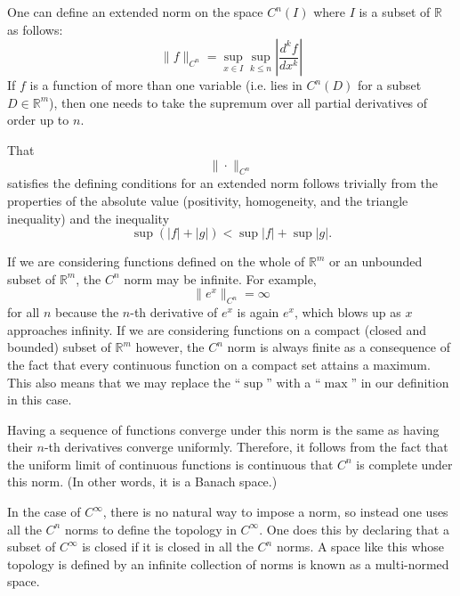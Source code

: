 \documentclass[12pt]{article}
\begin{document}
One can define an extended norm on the space $C^n (I)$ where $I$ is a subset of $\mathbb{R}$ as follows:
 $$\| f \|_{C^n} = \sup_{x \in I} \sup_{k \le n} \left| \frac{d^k f}{dx^k} \right|$$
If $f$ is a function of more than one variable (i.e. lies in $C^n (D)$ for a subset $D \in \mathbb{R}^m$), then one needs to take the supremum over all partial derivatives of order up to $n$.  

That $$\| \cdot \|_{C^n}$$ satisfies the defining conditions for an extended norm follows trivially from the properties of the absolute value (positivity, homogeneity, and the triangle inequality) and the inequality
 $$\sup (|f| + |g|) < \sup |f| + \sup |g|.$$

If we are considering functions defined on the whole of $\mathbb{R}^m$ or an unbounded subset of $\mathbb{R}^m$, the $C^n$ norm may be infinite.  For example,
 $$\| e^x \|_{C^n} = \infty$$
for all $n$ because the $n$-th derivative of $e^x$ is again $e^x$, which blows up as $x$ approaches infinity.  If we are considering functions on a compact (closed and bounded) subset of $\mathbb{R}^m$ however, the $C^n$ norm is always finite as a consequence of the fact that every continuous function on a compact set attains a maximum.  This also means that we may replace the ``$\sup$'' with a ``$\max$'' in our definition in this case.

Having a sequence of functions converge under this norm is the same as having their $n$-th derivatives converge uniformly.  Therefore, it follows from the fact that the uniform limit of continuous functions is continuous that $C^n$ is complete under this norm. (In other words, it is a Banach space.)

In the case of $C^{\infty}$, there is no natural way to impose a norm, so instead one uses all the $C^n$ norms to define the topology in $C^\infty$.  One does this by declaring that a subset of $C^\infty$ is closed if it is closed in all the $C^n$ norms.  A space like this whose topology is defined by an infinite collection of norms is known as a multi-normed space.
\end{document}
